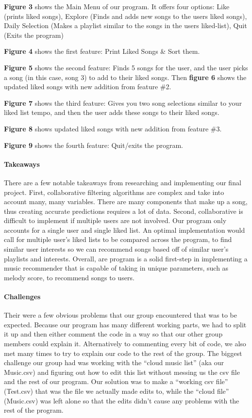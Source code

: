 \documentclass[]{article}
\let\oldparagraph\paragraph
\renewcommand{\paragraph}[1]{\oldparagraph{#1}\mbox{}}
\begin{document}
\textbf{Figure 3} shows the Main Menu of our program. It offers four
options: Like (prints liked songs), Explore (Finds and adds new songs to
the users liked songs), Daily Selection (Makes a playlist similar to the
songs in the users liked-list), Quit (Exits the program)

\textbf{Figure 4} shows the first feature: Print Liked Songs \& Sort
them.

\textbf{Figure 5} shows the second feature: Finds 5 songs for the user,
and the user picks a song (in this case, song 3) to add to their liked
songs. Then \textbf{figure 6} shows the updated liked songs with new
addition from feature \#2.

\textbf{Figure 7} shows the third feature: Gives you two song selections
similar to your liked list tempo, and then the user adds these songs to
their liked songs.

\textbf{Figure 8} shows updated liked songs with new addition from
feature \#3.

\textbf{Figure 9} shows the fourth feature: Quit/exits the program.

\paragraph{Takeaways}\label{takeaways}

There are a few notable takeaways from researching and implementing our
final project. First, collaborative filtering algorithms are complex and
take into account many, many variables. There are many components that
make up a song, thus creating accurate predictions requires a lot of
data. Second, collaborative is difficult to implement if multiple users
are not involved. Our program only accounts for a single user and single
liked list. An optimal implementation would call for multiple user's
liked lists to be compared across the program, to find similar user
interests so we can recommend songs based off of similar user's
playlists and interests. Overall, are program is a solid first-step in
implementing a music recommender that is capable of taking in unique
parameters, such as melody score, to recommend songs to users.

\paragraph{Challenges}\label{challenges}

Their were a few obvious problems that our group encountered that was to
be expected. Because our program has many different working parts, we
had to split it up and then either comment the code in a way so that our
other group members could explain it. Alternatively to commenting every
bit of code, we also met many times to try to explain our code to the
rest of the group. The biggest challenge our group had was working with
the ``cloud music list'' (aka our Music.csv) and figuring out how to
edit this list without messing us the csv file and the rest of our
program. Our solution was to make a ``working csv file'' (Test.csv) that
was the file we actually made edits to, while the ``cloud file''
(Music.csv) was left alone so that the edits didn't cause any problems
with the rest of the program.
\end{document}
